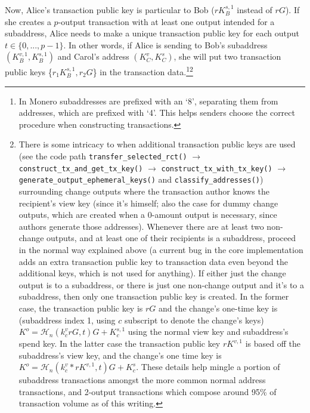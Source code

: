 Now, Alice's transaction public key is particular to Bob ($r K_B^{s,1}$ instead of $r G$). If she creates a $p$-output transaction with at least one output intended for a subaddress, Alice needs to make a unique transaction public key for each output $t \in \{0,...,p-1\}$. In other words, if Alice is sending to Bob's subaddress $(K_B^{v,1}, K_B^{s,1})$ and Carol's address $(K_C^v, K_C^s)$, she will put two transaction public keys \{$r_1 K_B^{s,1},r_2 G$\} in the transaction data.\footnote{In Monero subaddresses are prefixed with an ‘8’, separating them from addresses, which are prefixed with ‘4’. This helps senders choose the correct procedure when constructing transactions.}\footnote{There is some intricacy to when additional transaction public keys are used (see the code path {\tt transfer\_selected\_rct()} $\rightarrow$ {\tt construct\_tx\_and\_get\_tx\_key()} $\rightarrow$ {\tt construct\_tx\_with\_tx\_key()} $\rightarrow$ {\tt generate\_output\_ephemeral\_keys()} and {\tt classify\_addresses()}) surrounding change outputs where the transaction author knows the recipient's view key (since it's himself; also the case for dummy change outputs, which are created when a 0-amount output is necessary, since authors generate those addresses). Whenever there are at least two non-change outputs, and at least one of their recipients is a subaddress, proceed in the normal way explained above (a current bug in the core implementation adds an extra transaction public key to transaction data even beyond the additional keys, which is not used for anything). If either just the change output is to a subaddress, or there is just one non-change output and it's to a subaddress, then only one transaction public key is created. In the former case, the transaction public key is $rG$ and the change's one-time key is (subaddress index 1, using $c$ subscript to denote the change's keys) $K^o = \mathcal{H}_n(k^v_c r G,t)G + K_c^{s,1}$ using the normal view key and subaddress's spend key. In the latter case the transaction public key $r K^{v,1}$ is based off the subaddress's view key, and the change's one time key is $K^o = \mathcal{H}_n(k^v_c*r K^{v,1},t)G + K_c^s$. These details help mingle a portion of subaddress transactions amongst the more common normal address transactions, and 2-output transactions which compose around 95\% of transaction volume as of this writing.}



